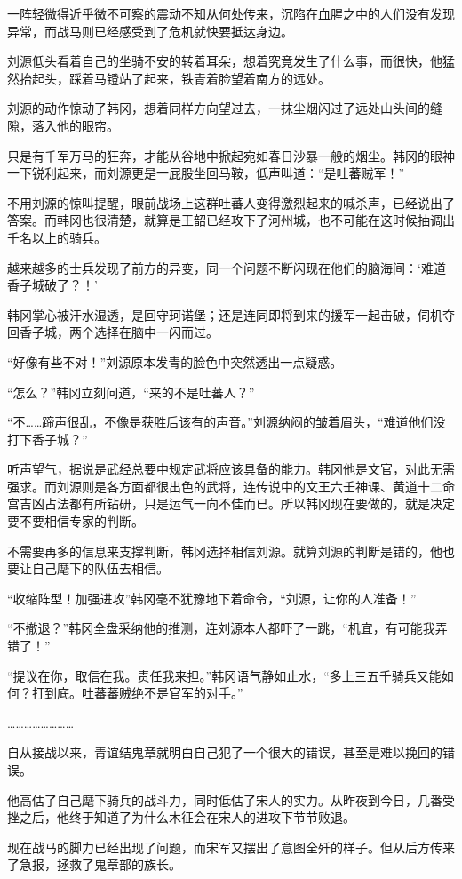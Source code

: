 一阵轻微得近乎微不可察的震动不知从何处传来，沉陷在血腥之中的人们没有发现异常，而战马则已经感受到了危机就快要抵达身边。

刘源低头看着自己的坐骑不安的转着耳朵，想着究竟发生了什么事，而很快，他猛然抬起头，踩着马镫站了起来，铁青着脸望着南方的远处。

刘源的动作惊动了韩冈，想着同样方向望过去，一抹尘烟闪过了远处山头间的缝隙，落入他的眼帘。

只是有千军万马的狂奔，才能从谷地中掀起宛如春日沙暴一般的烟尘。韩冈的眼神一下锐利起来，而刘源更是一屁股坐回马鞍，低声叫道：“是吐蕃贼军！”

不用刘源的惊叫提醒，眼前战场上这群吐蕃人变得激烈起来的喊杀声，已经说出了答案。而韩冈也很清楚，就算是王韶已经攻下了河州城，也不可能在这时候抽调出千名以上的骑兵。

越来越多的士兵发现了前方的异变，同一个问题不断闪现在他们的脑海间：‘难道香子城破了？！’

韩冈掌心被汗水湿透，是回守珂诺堡；还是连同即将到来的援军一起击破，伺机夺回香子城，两个选择在脑中一闪而过。

“好像有些不对！”刘源原本发青的脸色中突然透出一点疑惑。

“怎么？”韩冈立刻问道，“来的不是吐蕃人？”

“不……蹄声很乱，不像是获胜后该有的声音。”刘源纳闷的皱着眉头，“难道他们没打下香子城？”

听声望气，据说是武经总要中规定武将应该具备的能力。韩冈他是文官，对此无需强求。而刘源则是各方面都很出色的武将，连传说中的文王六壬神课、黄道十二命宫吉凶占法都有所钻研，只是运气一向不佳而已。所以韩冈现在要做的，就是决定要不要相信专家的判断。

不需要再多的信息来支撑判断，韩冈选择相信刘源。就算刘源的判断是错的，他也要让自己麾下的队伍去相信。

“收缩阵型！加强进攻”韩冈毫不犹豫地下着命令，“刘源，让你的人准备！”

“不撤退？”韩冈全盘采纳他的推测，连刘源本人都吓了一跳，“机宜，有可能我弄错了！”

“提议在你，取信在我。责任我来担。”韩冈语气静如止水，“多上三五千骑兵又能如何？打到底。吐蕃蕃贼绝不是官军的对手。”

……………………

自从接战以来，青谊结鬼章就明白自己犯了一个很大的错误，甚至是难以挽回的错误。

他高估了自己麾下骑兵的战斗力，同时低估了宋人的实力。从昨夜到今日，几番受挫之后，他终于知道了为什么木征会在宋人的进攻下节节败退。

现在战马的脚力已经出现了问题，而宋军又摆出了意图全歼的样子。但从后方传来了急报，拯救了鬼章部的族长。

